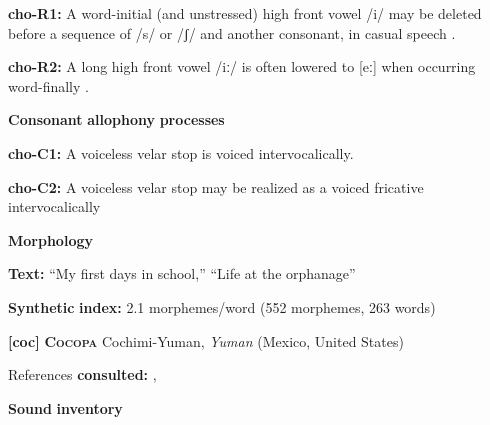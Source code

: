 \documentclass[output=paper]{langsci/langscibook}
\begin{document}
\begin{styleBody}
\textbf{cho-R1:} A word-initial (and unstressed) high front vowel /i/ may be deleted before a sequence of /s/ or /ʃ/ and another consonant, in casual speech \citep[19]{Broadwell2006}.
\end{styleBody}

\begin{styleBody}
\textbf{cho-R2:} A long high front vowel /iː/ is often lowered to [eː] when occurring word-finally \citep[30]{Broadwell2006}.
\end{styleBody}

\begin{styleBody}
\textbf{Consonant} \textbf{allophony} \textbf{processes}
\end{styleBody}

\begin{styleBody}
\textbf{cho-C1:} A voiceless velar stop is voiced intervocalically. \citep[15]{Broadwell2006}
\end{styleBody}

\begin{styleBody}
\textbf{cho-C2:}  A voiceless velar stop may be realized as a voiced fricative intervocalically \citep[15]{Broadwell2006}
\end{styleBody}

\begin{styleBody}
\textbf{Morphology}
\end{styleBody}

\begin{styleBody}
\textbf{Text:} “My first days in school,” “Life at the orphanage” \citep[355-360]{Broadwell2006}
\end{styleBody}

\begin{styleBody}
\textbf{Synthetic} \textbf{index:} 2.1 morphemes/word (552 morphemes, 263 words)
\end{styleBody}

\begin{styleBody}
\textbf{[coc]}   \textbf{\textsc{Cocopa}}    Cochimi-Yuman, \textit{Yuman} (Mexico, United States)
\end{styleBody}

\begin{styleBody}
References \textbf{consulted:} \citet{Bendixen1980}, \citet{Crawford1966}
\end{styleBody}

\begin{styleBody}
\textbf{Sound} \textbf{inventory}
\end{styleBody}
\end{document}
